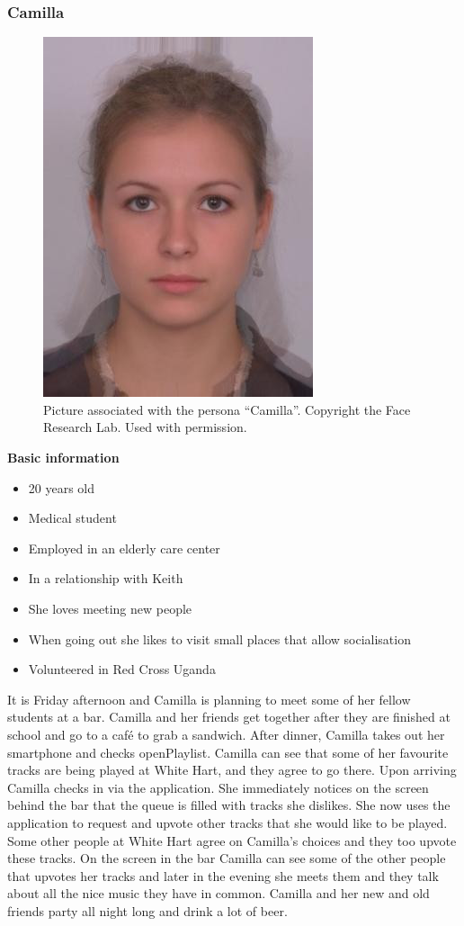 \subsubsection{Camilla}
\begin{figure} [h]
  \centering
  \includegraphics[]{Images/camilla.jpg}
  \caption{Picture associated with the persona \enquote{Camilla}. Copyright the Face Research Lab. Used with permission.}
  \label{fig:camilla}
\end{figure}
\noindent\textbf{Basic information}
\begin{itemize}
\item 20 years old
\item Medical student
\item Employed in an elderly care center
\item In a relationship with Keith
\item She loves meeting new people
\item When going out she likes to visit small places that allow socialisation
\item Volunteered in Red Cross Uganda
\end{itemize}

It is Friday afternoon and Camilla is planning to meet some of her fellow students at a bar. Camilla and her friends get together after they are finished at school and go to a café to grab a sandwich. After dinner, Camilla takes out her smartphone and checks openPlaylist. Camilla can see that some of her favourite tracks are being played at White Hart, and they agree to go there. Upon arriving Camilla checks in via the application. She immediately notices on the screen behind the bar that the queue is filled with tracks she dislikes. She now uses the application to request and upvote other tracks that she would like to be played. Some other people at White Hart agree on Camilla's choices and they too upvote these tracks. On the screen in the bar Camilla can see some of the other people that upvotes her tracks and later in the evening she meets them and they talk about all the nice music they have in common. Camilla and her new and old friends party all night long and drink a lot of beer.

